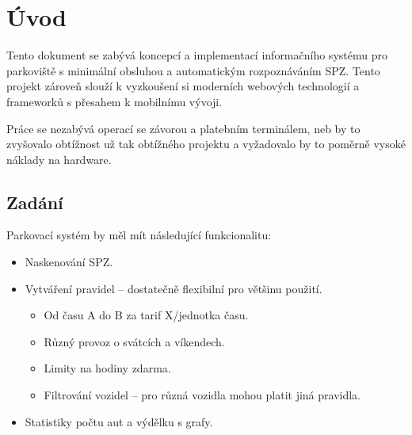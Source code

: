\chapter{Úvod} \label{uvod}

Tento dokument se zabývá koncepcí a implementací informačního systému pro
parkoviště s minimální obsluhou a automatickým rozpoznáváním SPZ.
Tento projekt zároveň slouží k vyzkoušení si moderních webových technologií
a frameworků s přesahem k mobilnímu vývoji.

Práce se nezabývá operací se závorou a platebním terminálem, neb by to zvyšovalo
obtížnost už tak obtížného projektu a vyžadovalo by to poměrně vysoké
náklady na hardware.

\section*{Zadání}

Parkovací systém by měl mít následující funkcionalitu:

\begin{itemize}
  \setlength\itemsep{0.05em}
  \item Naskenování SPZ.
  \item Vytváření pravidel -- dostatečně flexibilní pro většinu použití.
  \begin{itemize}
    \setlength\itemsep{0.05em}
      \item Od času A do B za tarif X/jednotka času.
      \item Různý provoz o svátcích a víkendech. \label{missing1}
      \item Limity na hodiny zdarma.
      \item Filtrování vozidel -- pro různá vozidla mohou platit jiná pravidla.
    \end{itemize}
  \item Statistiky počtu aut a výdělku s grafy.
  \end{itemize}
